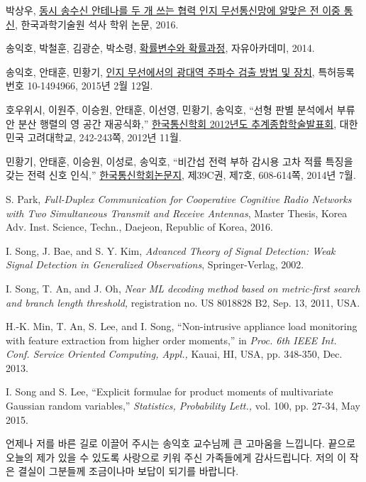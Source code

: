 \documentclass[doctor,korean,final]{kmu}
\begin{document}
\begin{thebibliography}{00}
 박상우, \underline{동시 송수신 안테나를 두 개 쓰는 협력 인지 무선통신망에 알맞은 전 이중 통신},
한국과학기술원 석사 학위 논문, 2016.

 송익호, 박철훈, 김광순, 박소령, \underline{확률변수와 확률과정}, 자유아카데미, 2014.

 송익호, 안태훈, 민황기, \underline{인지 무선에서의 광대역 주파수 검출 방법 및 장치}, 특허등록번호
10-1494966, 2015년 2월 12일.

 호우위시, 이원주, 이승원, 안태훈, 이선영, 민황기, 송익호, “선형 판별 분석에서 부류안 분산 행렬의 영 공간
재공식화,” \underline{한국통신학회 2012년도 추계종합학술발표회}, 대한민국 고려대학교, 242-243쪽, 2012년 11월.

 민황기, 안태훈, 이승원, 이성로, 송익호, “비간섭 전력 부하 감시용 고차 적률 특징을 갖는 전력 신호 인식,”
\underline{한국통신학회논문지}, 제39C권, 제7호, 608-614쪽, 2014년 7월.

 S. Park, \textit{Full-Duplex Communication for Cooperative
Cognitive Radio Networks with Two Simultaneous Transmit and Receive Antennas},
Master Thesis, Korea Adv. Inst. Science, Techn., Daejeon, Republic of Korea,
2016.

  I. Song, J. Bae, and S. Y. Kim, \textit{Advanced Theory of
Signal Detection: Weak Signal Detection in Generalized Observations},
Springer-Verlag, 2002.

 I. Song, T. An, and J. Oh, \textit{Near ML decoding method based
on metric-first search and branch length threshold,} registration no. US
8018828 B2, Sep. 13, 2011, USA.

  H.-K. Min, T. An, S. Lee, and I. Song, “Non-intrusive appliance
load monitoring with feature extraction from higher order moments,” in
\textit{Proc. 6th IEEE Int. Conf. Service Oriented Computing, Appl.,} Kauai,
HI, USA, pp. 348-350, Dec. 2013.

 I. Song and S. Lee, “Explicit formulae for product moments of
 multivariate Gaussian random variables,” \textit{Statistics, Probability
Lett.,} vol. 100, pp. 27-34, May 2015.

\end{thebibliography}



\acknowledgment[1]
언제나 저를 바른 길로 이끌어 주시는 송익호 교수님께 큰 고마움을 느낍니다.
끝으로 오늘의 제가 있을 수 있도록 사랑으로 키워 주신 가족들에게 감사드립니다.
저의 이 작은 결실이 그분들께 조금이나마 보답이 되기를 바랍니다.


\end{document}
